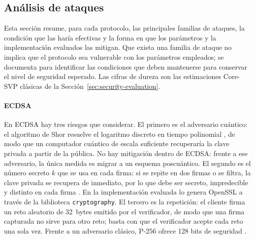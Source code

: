 \subsection{Análisis de ataques}
\label{sec:attack-analysis}

Esta sección resume, para cada protocolo, las principales familias de ataques, la condición que las haría efectivas y la forma en que los parámetros y la implementación evaluados las mitigan. Que exista una familia de ataque no implica que el protocolo sea vulnerable con los parámetros empleados; se documenta para identificar las condiciones que deben mantenerse para conservar el nivel de seguridad esperado. Las cifras de dureza son las estimaciones Core-SVP clásicas de la Sección~\ref{sec:security-evaluation}.

\paragraph{ECDSA}
En ECDSA hay tres riesgos que considerar. El primero es el adversario cuántico: el algoritmo de Shor resuelve el logaritmo discreto en tiempo polinomial \cite{huang2018lattice, rewal2023quantumsafe, mukil2026implementing}, de modo que un computador cuántico de escala suficiente recuperaría la clave privada a partir de la pública. No hay mitigación dentro de ECDSA: frente a ese adversario, la única medida es migrar a un esquema poscuántico. El segundo es el número secreto $k$ que se usa en cada firma: si se repite en dos firmas o se filtra, la clave privada se recupera de inmediato, por lo que debe ser secreto, impredecible y distinto en cada firma \cite{nist2023fips186}. En la implementación evaluada lo genera OpenSSL a través de la biblioteca \texttt{cryptography}. El tercero es la repetición: el cliente firma un reto aleatorio de 32~bytes emitido por el verificador, de modo que una firma capturada no sirve para otro reto; basta con que el verificador acepte cada reto una sola vez. Frente a un adversario clásico, P-256 ofrece 128 bits de seguridad \cite{barker2020sp80057}.

